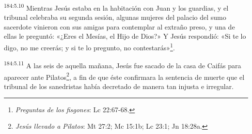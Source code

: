 \par
\textsuperscript{184:5.10} Mientras Jesús estaba en la habitación con Juan y los guardias, y el tribunal celebraba su segunda sesión, algunas mujeres del palacio del sumo sacerdote vinieron con sus amigas para contemplar al extraño preso, y una de ellas le preguntó: «¿Eres el Mesías, el Hijo de Dios?» Y Jesús respondió: «Si te lo digo, no me creerás; y si te lo pregunto, no contestarás»\footnote{\textit{Preguntas de los fisgones}: Lc 22:67-68.}.

\par
\textsuperscript{184:5.11} A las seis de aquella mañana, Jesús fue sacado de la casa de Caifás para aparecer ante Pilatos\footnote{\textit{Jesús llevado a Pilatos}: Mt 27:2; Mc 15:1b; Lc 23:1; Jn 18:28a.}, a fin de que éste confirmara la sentencia de muerte que el tribunal de los sanedristas había decretado de manera tan injusta e irregular.